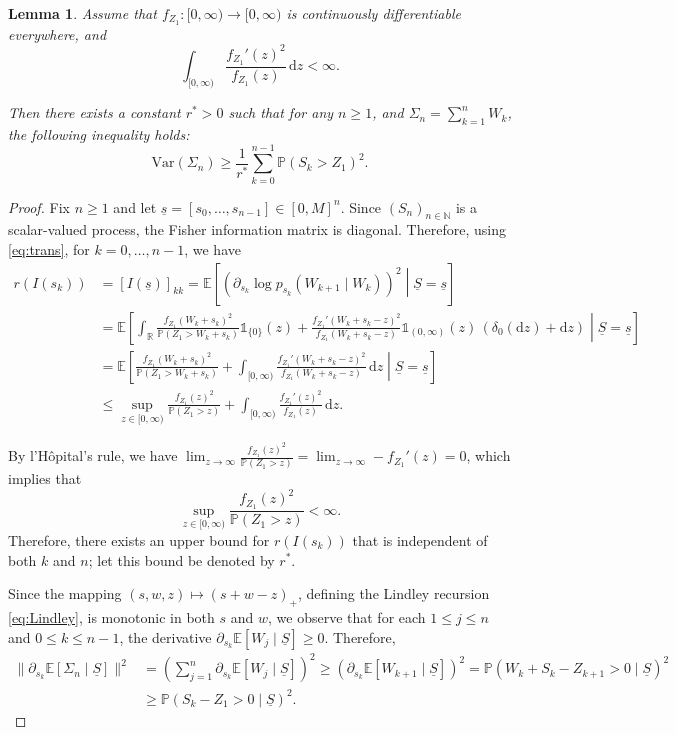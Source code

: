 \documentclass[a4paper,10pt]{article}
\newtheorem{lemma}[theorem]{Lemma}
\renewcommand{\P}{\mathbb{P}}
\newcommand{\ind}{\mathds{1}}
\newcommand{\var}{\mathrm{Var}}
\newcommand{\ul}[1]{\underline{#1}}
\begin{document}
\begin{lemma}\label{lem:q:fclt}
	Assume that $f_{Z_1}: [0, \infty) \to [0, \infty)$ is continuously differentiable everywhere, and 
	\[
	\int_{[0, \infty)}
	\frac{f_{Z_1}'(z)^2}{f_{Z_1}(z)}
	\,\mathrm{d}z < \infty.
	\]
	
	Then there exists a constant $r^*>0$ such that for any $n \geq 1$, and $\Sigma_n = \sum_{k=1}^{n} W_k$, the following inequality holds:
	\[
	\var(\Sigma_n) \geq \frac{1}{r^*}\sum_{k=0}^{n-1}\P (S_k>Z_1)^2.
	\]
\end{lemma}

\begin{proof}
	Fix $n \geq 1$ and let $\ul{s} = [s_0, \ldots, s_{n-1}] \in [0, M]^n$. Since $(S_n)_{n \in \mathbb{N}}$ is a scalar-valued process, the Fisher information matrix is diagonal. Therefore, using \eqref{eq:trans}, for $k = 0, \ldots, n-1$, we have
	\begin{align*}
		r(I(s_k)) &= [I(\ul{s})]_{kk} = \mathbb{E}\left[ \left( \partial_{s_k} \log p_{s_k}(W_{k+1} \mid W_k) \right)^2 \middle| \ul{S} = \ul{s} \right] 
		\\
		&= \mathbb{E} \left[ \int_{\mathbb{R}} \frac{f_{Z_1}(W_k + s_k)^2}{\mathbb{P}(Z_1 > W_k + s_k)} \ind_{\{0\}}(z) + \frac{f_{Z_1}'(W_k + s_k - z)^2}{f_{Z_1}(W_k + s_k - z)} \ind_{(0, \infty)}(z) \, (\delta_0 (\mathrm{d}z) + \mathrm{d}z) \middle| \ul{S} = \ul{s} \right]
		\\
		&= \mathbb{E} \left[ \frac{f_{Z_1}(W_k + s_k)^2}{\mathbb{P}(Z_1 > W_k + s_k)} + \int_{[0, \infty)} \frac{f_{Z_1}'(W_k + s_k - z)^2}{f_{Z_1}(W_k + s_k - z)} \, \mathrm{d}z \middle| \ul{S} = \ul{s} \right]
		\\
		&\leq \sup_{z \in [0, \infty)} \frac{f_{Z_1}(z)^2}{\mathbb{P}(Z_1 > z)} + \int_{[0, \infty)} \frac{f_{Z_1}'(z)^2}{f_{Z_1}(z)} \, \mathrm{d}z.
	\end{align*}
	
	By l'Hôpital's rule, we have $\lim_{z \to \infty} \frac{f_{Z_1}(z)^2}{\mathbb{P}(Z_1 > z)} = \lim_{z \to \infty} -f_{Z_1}'(z) = 0$, which implies that 
	\[
	\sup_{z \in [0, \infty)} \frac{f_{Z_1}(z)^2}{\mathbb{P}(Z_1 > z)} < \infty.
	\]
	Therefore, there exists an upper bound for $r(I(s_k))$ that is independent of both $k$ and $n$; let this bound be denoted by $r^*$.
	
	Since the mapping $(s, w, z) \mapsto (s + w - z)_+$, defining the Lindley recursion \eqref{eq:Lindley}, is monotonic in both $s$ and $w$, we observe that for each $1 \leq j \leq n$ and $0 \leq k \leq n-1$, the derivative $\partial_{s_k} \mathbb{E} \left[ W_j \mid \ul{S} \right] \geq 0$. Therefore,
	\begin{align*}
		\lVert \partial_{s_k} \mathbb{E} \left[ \Sigma_n \mid \ul{S} \right] \rVert^2 &= \left( \sum_{j=1}^{n} \partial_{s_k} \mathbb{E} \left[ W_j \mid \ul{S} \right] \right)^2
		\geq \left( \partial_{s_k} \mathbb{E} \left[ W_{k+1} \mid \ul{S} \right] \right)^2 = \mathbb{P}(W_k + S_k - Z_{k+1} > 0 \mid \ul{S})^2
		\\
		&\geq \mathbb{P}(S_k - Z_1 > 0 \mid \ul{S})^2.
	\end{align*}
	

\end{proof}
\end{document}
